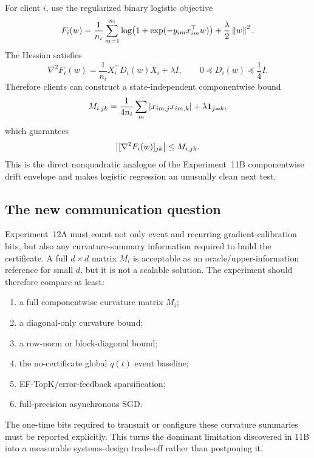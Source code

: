 For client $i$, use the regularized binary logistic objective
\begin{equation}
  F_i(w)
  =
  \frac{1}{n_i}\sum_{m=1}^{n_i}
  \log\!\left(1+\exp(-y_{im}x_{im}^\top w)\right)
  +\frac{\lambda}{2}\left\lVert w\right\rVert^2.
\end{equation}
The Hessian satisfies
\begin{equation}
  \nabla^2F_i(w)
  =
  \frac{1}{n_i}X_i^\top D_i(w)X_i+\lambda I,
  \qquad
  0\preceq D_i(w)\preceq\frac14 I.
\end{equation}
Therefore clients can construct a state-independent componentwise bound
\begin{equation}
  M_{i,jk}
  =
  \frac{1}{4n_i}\sum_m\left|x_{im,j}x_{im,k}\right|
  +\lambda\mathbf 1_{j=k},
\end{equation}
which guarantees
\begin{equation}
  \left|[\nabla^2F_i(w)]_{jk}\right|
  \leq M_{i,jk}.
\end{equation}
This is the direct nonquadratic analogue of the Experiment~11B componentwise drift envelope and makes logistic regression an unusually clean next test.

\subsection{The new communication question}

Experiment~12A must count not only event and recurring gradient-calibration bits, but also any curvature-summary information required to build the certificate. A full $d\times d$ matrix $M_i$ is acceptable as an oracle/upper-information reference for small $d$, but it is not a scalable solution. The experiment should therefore compare at least:
\begin{enumerate}
  \item a full componentwise curvature matrix $M_i$;
  \item a diagonal-only curvature bound;
  \item a row-norm or block-diagonal bound;
  \item the no-certificate global $q(t)$ event baseline;
  \item EF-TopK/error-feedback sparsification;
  \item full-precision asynchronous SGD.
\end{enumerate}
The one-time bits required to transmit or configure these curvature summaries must be reported explicitly. This turns the dominant limitation discovered in 11B into a measurable systems-design trade-off rather than postponing it.

